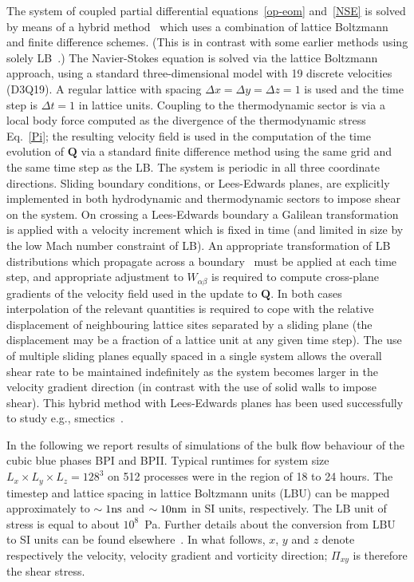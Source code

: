 \documentclass[8.5pt,twoside,twocolumn]{article}
\begin{document}
The system of coupled partial differential equations~\ref{op-eom}
and~\ref{NSE} is solved by means of a hybrid method~\cite{Marenduzzo:2007}
which uses a combination of lattice Boltzmann and finite difference schemes.
(This is in contrast with some earlier methods using solely
LB~\cite{Denniston:2001, Denniston:2004}.)
The Navier-Stokes
equation is solved via the lattice Boltzmann approach, using a standard
three-dimensional model with 19 discrete velocities (D3Q19).
A regular lattice with spacing $\Delta x = \Delta y = \Delta z = 1$ is
used and the time step is $\Delta t = 1$ in lattice units.
Coupling to the thermodynamic sector is via a
local body force computed as the divergence of the thermodynamic
stress Eq.~\ref{Pi}; the resulting velocity field is used in the computation
of the time evolution of $\mathbf{Q}$ via a standard finite difference
method using the same grid and the same time step as the LB. The system
is periodic in all three coordinate directions. Sliding
boundary conditions, or Lees-Edwards planes, are explicitly implemented
in both hydrodynamic and thermodynamic sectors to impose shear on the
system. On
crossing a Lees-Edwards boundary a Galilean transformation is applied
with a velocity increment which is fixed in time (and limited in size by the
low Mach number constraint of LB). An appropriate transformation
of LB distributions which propagate across a boundary~\cite{Wagner:2002}
must be applied at each time step, and appropriate
adjustment to $W_{\alpha\beta}$ is required to compute cross-plane
gradients of the velocity field used in the update to ${\mathbf Q}$.
In both cases interpolation of the
relevant quantities is required to cope with the relative displacement
of neighbouring lattice sites separated by a sliding plane (the
displacement may be a fraction of a lattice unit at any given time
step). The use of multiple sliding planes equally spaced in a single
system allows
the overall shear rate to be maintained indefinitely as the system
becomes larger
in the velocity gradient direction (in contrast with the use of solid
walls to impose shear). This hybrid method with Lees-Edwards planes
has been used successfully to study e.g., smectics~\cite{Henrich:2012a}.


In the following we report results of simulations of the bulk flow behaviour of the cubic blue 
phases BPI and BPII.
Typical runtimes for system size $L_x\times L_y\times L_z=128^3$ on 512 processes were in the region of 18 to 24 hours.  
The timestep and lattice spacing in lattice Boltzmann units (LBU) can be mapped
approximately to $\sim 1 {\rm ns}$ and $\sim 10{\rm nm}$ in SI units, respectively. The LB unit of stress
is equal to about $10^8$~Pa. Further details about the conversion 
from LBU to SI units can be found elsewhere~\cite{Henrich:2011a,Henrich:2010b}.
In what follows, $x$, $y$ and $z$ denote respectively the velocity, velocity
gradient and vorticity direction; $\Pi_{xy}$ is therefore the shear stress.
\end{document}
